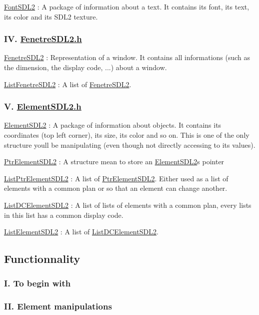 \begin{DoxyEnumerate}
\item \hyperlink{structFontSDL2}{Font\+S\+D\+L2} \+: A package of information about a text. It contains its font, its text, its color and its S\+D\+L2 texture.
\end{DoxyEnumerate}

\subsubsection*{IV. \hyperlink{FenetreSDL2_8h_source}{Fenetre\+S\+D\+L2.\+h}}


\begin{DoxyEnumerate}
\item \hyperlink{structFenetreSDL2}{Fenetre\+S\+D\+L2} \+: Representation of a window. It contains all informations (such as the dimension, the display code, ...) about a window.
\item \hyperlink{structListFenetreSDL2}{List\+Fenetre\+S\+D\+L2} \+: A list of \hyperlink{structFenetreSDL2}{Fenetre\+S\+D\+L2}.
\end{DoxyEnumerate}

\subsubsection*{V. \hyperlink{ElementSDL2_8h}{Element\+S\+D\+L2.\+h}}


\begin{DoxyEnumerate}
\item \hyperlink{structElementSDL2}{Element\+S\+D\+L2} \+: A package of information about objects. It contains its coordinates (top left corner), its size, its color and so on. This is one of the only structure you\textquotesingle{}ll be manipulating (even though not directly accessing to its values).
\item \hyperlink{structPtrElementSDL2}{Ptr\+Element\+S\+D\+L2} \+: A structure mean to store an \hyperlink{structElementSDL2}{Element\+S\+D\+L2}\textquotesingle{}s pointer
\item \hyperlink{structListPtrElementSDL2}{List\+Ptr\+Element\+S\+D\+L2} \+: A list of \hyperlink{structPtrElementSDL2}{Ptr\+Element\+S\+D\+L2}. Either used as a list of elements with a common plan or so that an element can change another.
\item \hyperlink{structListDCElementSDL2}{List\+D\+C\+Element\+S\+D\+L2} \+: A list of lists of elements with a common plan, every lists in this list has a common display code.
\item \hyperlink{structListElementSDL2}{List\+Element\+S\+D\+L2} \+: A list of \hyperlink{structListDCElementSDL2}{List\+D\+C\+Element\+S\+D\+L2}.
\end{DoxyEnumerate}

\subsection*{Functionnality}

\subsubsection*{I. To begin with}

\subsubsection*{II. Element manipulations}